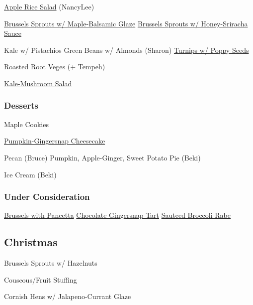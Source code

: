 \begin{centering}
 \hyperref[Apple Rice Salad]{Apple Rice Salad} (NancyLee)

 \href{http://www.seriouseats.com/recipes/2012/11/roasted-brussels-sprouts-bacon-pecans-maple-balsamic-recipe.html}{Brussels Sprouts w/ Maple-Balsamic Glaze} \blt
 \href{https://thepioneerwoman.com/food-and-friends/crispy-fried-brussels-sprouts/}{Brussels Sprouts w/ Honey-Sriracha Sauce}

 Kale w/ Pistachios \blt
 Green Beans w/ Almonds (Sharon) \blt
 \href{http://www.foodnetwork.com/recipes/mario-batali/roasted-turnips-recipe.html}{Turnips w/ Poppy Seeds}

 Roasted Root Veges (+ Tempeh)

 \href{https://www.seriouseats.com/recipes/2016/11/warm-kale-caramelized-mushroom-salad-recipe.html}{Kale-Mushroom Salad}

 \subsubsection*{Desserts}

 Maple Cookies

 \href{https://www.onceuponachef.com/recipes/pumpkin-cheesecake-with-gingersnap-crust-and-caramel-sauce.html}{Pumpkin-Gingersnap Cheesecake}

 Pecan (Bruce) \blt Pumpkin, Apple-Ginger, Sweet Potato Pie (Beki)

 Ice Cream (Beki)

 \subsubsection*{Under Consideration}

 \href{http://smittenkitchen.com/blog/2009/12/balsamic-braised-brussels-with-pancetta/}{Brussels with Pancetta} \blt
 \href{http://smittenkitchen.com/blog/2008/11/dark-chocolate-tart-with-gingersnap-crust/}{Chocolate Gingersnap Tart} \blt
 \href{http://www.foodandwine.com/recipes/broccoli-rabe-with-lemon-butter}{Sauteed Broccoli Rabe}

 \subsection*{Christmas}

 Brussels Sprouts w/ Hazelnuts

 Couscous/Fruit Stuffing

 Cornish Hens w/ Jalapeno-Currant Glaze


\end{centering}
